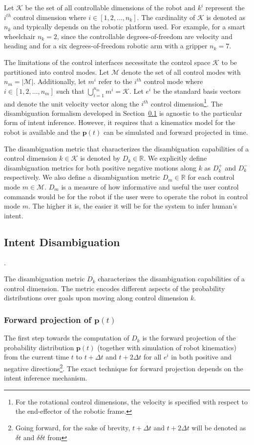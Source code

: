 Let $\mathcal{K}$ be the set of all controllable dimensions of the robot and $k^i$ represent the $i^{th}$ control dimension where $i \in [1,2,\dots,n_k]$. The cardinality of $\mathcal{K}$ is denoted as $n_k$ and typically depends on the robotic platform used. For example, for a smart wheelchair $n_k = 2$, since the controllable degrees-of-freedom are velocity and heading and for a six degrees-of-freedom robotic arm with a gripper $n_k = 7$. 

The limitations of the control interfaces necessitate the control space $\mathcal{K}$ to be partitioned into control modes. Let $\mathcal{M}$ denote the set of all control modes with $n_m = \vert\mathcal{M}\vert$. Additionally, let $m^i$ refer to the $i^{th}$ control mode where $i \in [1,2,\dots,n_m]$  such that $\bigcup\limits_{i=1}^{n_m} m^i = \mathcal{K}$. Let $e^i$ be the standard basis vectors and denote the unit velocity vector along the $i^{th}$ control dimension\footnote{For the rotational control dimensions, the velocity is specified with respect to the end-effector of the robotic frame.}. The disambiguation formalism developed in Section~\ref{subsec:disamb} is agnostic to the particular form of intent inference. However, it requires that a kinematics model for the robot is available and the $\boldsymbol{p}(t)$ can be simulated and forward projected in time. 

The disambiguation metric that characterizes the disambiguation capabilities of a control dimension $k \in \mathcal{K}$ is denoted by $D_k \in \mathbb{R}$. We explicitly define disambiguation metrics for both positive negative motions along $k$ as $D_k^{+}$ and $D_k^{-}$ respectively. We also define a disambiguation metric $D_m \in \mathbb{R}$ for each control mode $m \in \mathcal{M}$. $D_m$ is a measure of how informative and useful the user control commands would be for the robot if the user were to operate the robot in control mode $m$. The higher it is, the easier it will be for the system to infer human's intent. 
\subsection{Intent Disambiguation}\label{subsec:disamb}. 

The disambiguation metric $D_k$ characterizes the disambiguation capabilities of a control dimension. The metric encodes different aspects of the probability distributions over goals upon moving along control dimension $k$. 

\subsubsection{Forward projection of $\boldsymbol{p}(t)$}
The first step towards the computation of $D_k$ is the forward projection of the probability distribution $\boldsymbol{p}(t)$ (together with simulation of robot kinematics) from the current time $t$ to $t + \Delta t$ and $t + 2\Delta t$ for all $e^i$ in both positive and negative directions\footnote{Going forward, for the sake of brevity, $t+\Delta t$ and $t + 2 \Delta t$ will be denoted as $\delta t$ and $\delta\delta t$ from}. The exact technique for forward projection depends on the intent inference mechanism.

